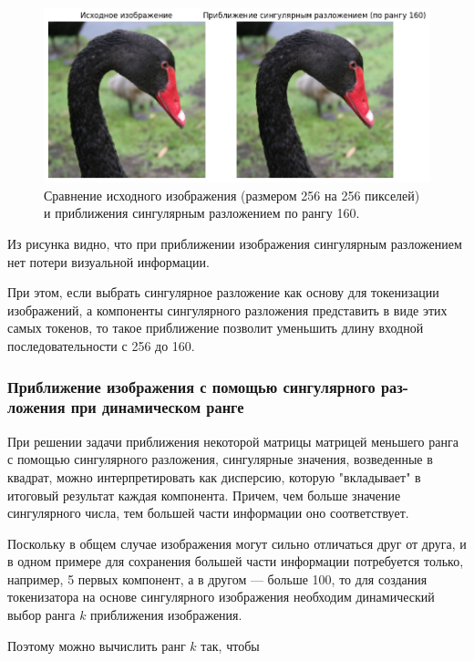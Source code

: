 \documentclass[times,specification,annotation]{itmo-student-thesis}
\begin{document}
\begin{figure}[H]
\label{fig:svd-approx-im-fix-rank}
    \centering
    \includegraphics[width=1.0\textwidth]
    {images/solutions_analysis/svd/svd_approx_im_160rank.png}
    \caption{Сравнение исходного изображения (размером 256 на 256 пикселей) и приближения сингулярным разложением по рангу 160.}
\end{figure}

Из рисунка видно, что при приближении изображения сингулярным разложением нет потери визуальной информации.

При этом, если выбрать сингулярное разложение как основу для токенизации изображений, а компоненты сингулярного разложения представить в виде этих самых токенов, то такое приближение позволит уменьшить длину входной последовательности с 256 до 160.

\subsubsection{Приближение изображения с помощью сингулярного раз-
ложения при динамическом ранге}

При решении задачи приближения некоторой матрицы матрицей меньшего ранга с помощью сингулярного разложения, сингулярные значения, возведенные в квадрат, можно интерпретировать как дисперсию, которую "вкладывает" в итоговый результат каждая компонента. Причем, чем больше значение сингулярного числа, тем большей части информации оно соответствует. 

Поскольку в общем случае изображения могут сильно отличаться друг от друга, и в одном примере для сохранения большей части информации потребуется только, например, 5 первых компонент, а в другом --- больше 100, то для создания токенизатора на основе сингулярного изображения необходим динамический выбор ранга $k$ приближения изображения.   

Поэтому можно вычислить ранг $k$ так, чтобы
\end{document}
